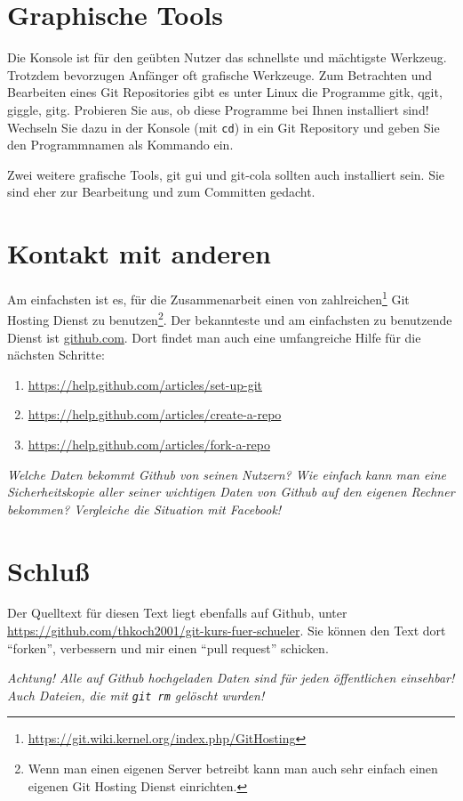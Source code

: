 \documentclass[11pt,a4paper,twoside]{scrartcl}
\begin{document}
\section{Graphische Tools}

Die Konsole ist für den geübten Nutzer das schnellste und mächtigste
Werkzeug. Trotzdem bevorzugen Anfänger oft grafische Werkzeuge. Zum Betrachten
und Bearbeiten eines Git Repositories gibt es unter Linux die Programme gitk,
qgit, giggle, gitg. Probieren Sie aus, ob diese Programme bei Ihnen
installiert sind! Wechseln Sie dazu in der Konsole (mit \lstinline{cd}) in ein
Git Repository und geben Sie den Programmnamen als Kommando ein.

Zwei weitere grafische Tools, git gui und git-cola sollten auch installiert
sein. Sie sind eher zur Bearbeitung und zum Committen gedacht.

\section{Kontakt mit anderen}

Am einfachsten ist es, für die Zusammenarbeit einen von
zahlreichen\footnote{\url{https://git.wiki.kernel.org/index.php/GitHosting}}
Git Hosting Dienst zu benutzen\footnote{Wenn man einen eigenen Server betreibt
  kann man auch sehr einfach einen eigenen Git Hosting Dienst
  einrichten.}. Der bekannteste und am einfachsten zu benutzende Dienst ist
\url{github.com}. Dort findet man auch eine umfangreiche Hilfe für die
nächsten Schritte:

\begin{enumerate}
  \item \url{https://help.github.com/articles/set-up-git}
  \item \url{https://help.github.com/articles/create-a-repo}
  \item \url{https://help.github.com/articles/fork-a-repo}
\end{enumerate}

\emph{Welche Daten bekommt Github von seinen Nutzern? Wie einfach kann man eine
Sicherheitskopie aller seiner wichtigen Daten von Github auf den eigenen
Rechner bekommen? Vergleiche die Situation mit Facebook!}

\section{Schluß}

Der \latex Quelltext für diesen Text liegt ebenfalls auf Github, unter
\url{https://github.com/thkoch2001/git-kurs-fuer-schueler}. Sie können den
Text dort ``forken'', verbessern und mir einen ``pull request'' schicken.

\emph{Achtung! Alle auf Github hochgeladen Daten sind für jeden öffentlichen
  einsehbar! Auch Dateien, die mit \lstinline{git rm} gelöscht wurden!}
\end{document}
